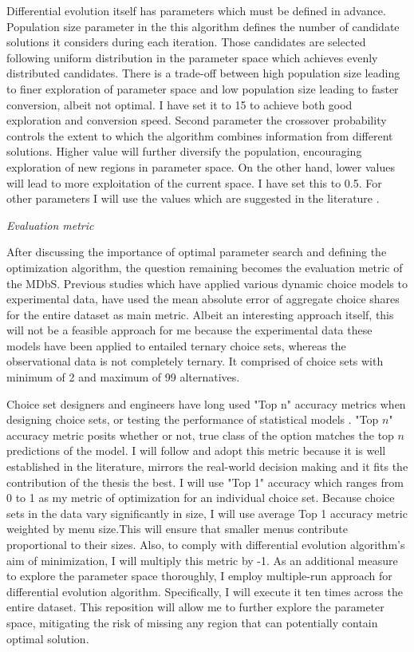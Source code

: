 \documentclass[a4paper,12pt]{article}
\begin{document}
Differential evolution itself has parameters which must be defined in advance. Population size parameter in the this algorithm defines the number of candidate solutions it considers during each iteration. Those candidates are selected following uniform distribution in the parameter space which achieves evenly distributed candidates. There is a trade-off between high population size leading to finer exploration of parameter space and low population size leading to faster conversion, albeit not optimal. I have set it to 15 to achieve both good exploration and conversion speed. Second parameter the crossover probability controls the extent to which the algorithm combines information from different solutions. Higher value will further diversify the population, encouraging exploration of new regions in parameter space. On the other hand, lower values will lead to more exploitation of the current space. I have set this to 0.5. For other parameters I will use the values which are suggested in the literature \citep{omidi2020differential}.

\textit{Evaluation metric}

After discussing the importance of optimal parameter search and defining the optimization algorithm, the question remaining becomes the evaluation metric of the MDbS. Previous studies which have applied various dynamic choice models to experimental data, have used the mean absolute error of aggregate choice shares for the entire dataset as main metric. Albeit an interesting approach itself, this will not be a feasible approach for me because the experimental data these models have been applied to entailed ternary choice sets, whereas the observational data is not completely ternary. It comprised of choice sets with minimum of 2 and maximum of 99 alternatives. 

Choice set designers and engineers have long used "Top n" accuracy metrics when designing choice sets, or testing the performance of statistical models \citep{ricci2015recommender}. "Top $n$" accuracy metric posits whether or not, true class of the option matches the top $n$ predictions of the model. I will follow and adopt this metric because it is well established in the literature, mirrors the real-world decision making and it fits the contribution of the thesis the best. I will use "Top 1" accuracy which ranges from 0 to 1 as my metric of optimization for an individual choice set. Because choice sets in the data vary significantly in size, I will use average Top 1 accuracy metric weighted by menu size.This will ensure that smaller menus contribute proportional to their sizes. Also, to comply with differential evolution algorithm's aim of minimization, I will multiply this metric by -1. As an additional measure to explore the parameter space thoroughly, I employ multiple-run approach for differential evolution algorithm. Specifically, I will execute it ten times across the entire dataset. This reposition will allow me to further explore the parameter space, mitigating the risk of missing any region that can potentially contain optimal solution.
\end{document}
